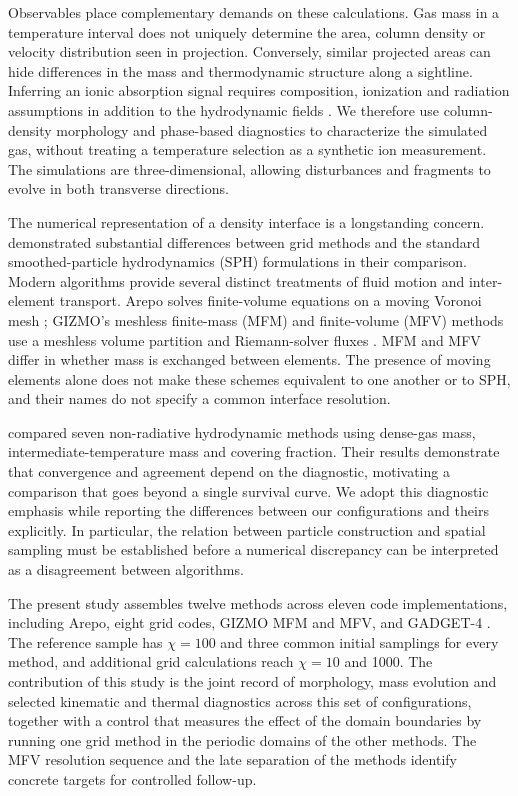 \documentclass[twocolumn,apj,numberedappendix]{openjournal}
\begin{document}
Observables place complementary demands on these calculations. Gas mass in a temperature interval does not uniquely determine the area, column density or velocity distribution seen in projection. Conversely, similar projected areas can hide differences in the mass and thermodynamic structure along a sightline. Inferring an ionic absorption signal requires composition, ionization and radiation assumptions in addition to the hydrodynamic fields \citep{Werk2014}. We therefore use column-density morphology and phase-based diagnostics to characterize the simulated gas, without treating a temperature selection as a synthetic ion measurement. The simulations are three-dimensional, allowing disturbances and fragments to evolve in both transverse directions.

The numerical representation of a density interface is a longstanding concern. \citet{Agertz2007} demonstrated substantial differences between grid methods and the standard smoothed-particle hydrodynamics (SPH) formulations in their comparison. Modern algorithms provide several distinct treatments of fluid motion and inter-element transport. Arepo solves finite-volume equations on a moving Voronoi mesh \citep{Springel2010}; GIZMO's meshless finite-mass (MFM) and finite-volume (MFV) methods use a meshless volume partition and Riemann-solver fluxes \citep{Hopkins2015}. MFM and MFV differ in whether mass is exchanged between elements. The presence of moving elements alone does not make these schemes equivalent to one another or to SPH, and their names do not specify a common interface resolution.

\citet{Braspenning2023} compared seven non-radiative hydrodynamic methods using dense-gas mass, intermediate-temperature mass and covering fraction. Their results demonstrate that convergence and agreement depend on the diagnostic, motivating a comparison that goes beyond a single survival curve. We adopt this diagnostic emphasis while reporting the differences between our configurations and theirs explicitly. In particular, the relation between particle construction and spatial sampling must be established before a numerical discrepancy can be interpreted as a disagreement between algorithms.

The present study assembles twelve methods across eleven code implementations, including Arepo, eight grid codes, GIZMO MFM and MFV, and GADGET-4 \citep{Springel2021}. The reference sample has $\chi=100$ and three common initial samplings for every method, and additional grid calculations reach $\chi=10$ and 1000. The contribution of this study is the joint record of morphology, mass evolution and selected kinematic and thermal diagnostics across this set of configurations, together with a control that measures the effect of the domain boundaries by running one grid method in the periodic domains of the other methods. The MFV resolution sequence and the late separation of the methods identify concrete targets for controlled follow-up.
\end{document}
